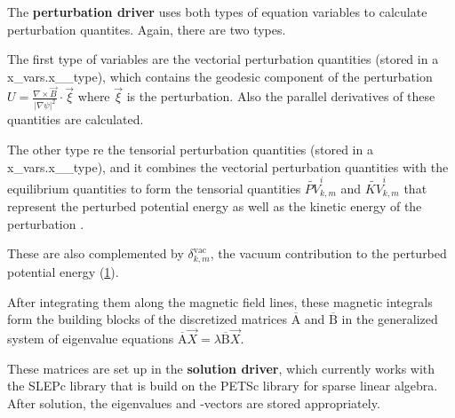 The {\bfseries perturbation driver} uses both types of equation variables to calculate perturbation quantites. Again, there are two types.
\begin{DoxyItemize}
\item The first type of variables are the vectorial perturbation quantities (stored in a x\+\_\+vars.\+x\+\_\+\_\+type), which contains the geodesic component of the perturbation $U = \frac{\nabla \times \vec{B}}{\left|\nabla \psi\right|^2} \cdot \vec{\xi}$ where $\vec{\xi}$ is the perturbation. Also the parallel derivatives of these quantities are calculated.
\item The other type re the tensorial perturbation quantities (stored in a x\+\_\+vars.\+x\+\_\+\_\+type), and it combines the vectorial perturbation quantities with the equilibrium quantities to form the tensorial quantities $\widetilde{PV}_{k,m}^i$ and $\widetilde{KV}_{k,m}^i$ that represent the perturbed potential energy as well as the kinetic energy of the perturbation \cite{weyens2014theory}.
\end{DoxyItemize}

These are also complemented by $\delta_{k,m}^\text{vac}$, the vacuum contribution to the perturbed potential energy (\hyperlink{page_overview_fng1}{1}).

After integrating them along the magnetic field lines, these magnetic integrals form the building blocks of the discretized matrices $\overline{\text{A}}$ and $\overline{\text{B}}$ in the generalized system of eigenvalue equations $\overline{\text{A}} \vec{X} = \lambda \overline{\text{B}}\vec{X}$.

These matrices are set up in the {\bfseries solution driver}, which currently works with the S\+L\+E\+Pc library that is build on the P\+E\+T\+Sc library for sparse linear algebra. After solution, the eigenvalues and -\/vectors are stored appropriately.

